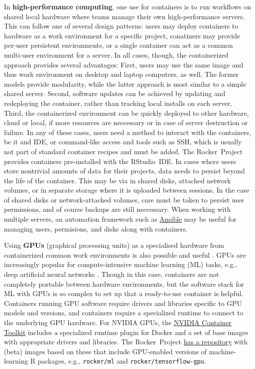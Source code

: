 In \textbf{high-performance computing}, one use for containers is to run
workflows on shared local hardware where teams manage their own
high-performance servers. This can follow one of several design
patterns: users may deploy containers to hardware as a work environment
for a specific project, conatiners may provide per-user persistent
environments, or a single container can act as a common multi-user
environment for a server. In all cases, though, the containerized
approach provides several advantages: First, users may use the same
image and thus work environment on desktop and laptop computers, as
well. The former models provide modularity, while the latter approach is
most similar to a simple shared server. Second, software updates can be
achieved by updating and redeploying the container, rather than tracking
local installs on each server. Third, the containerized environment can
be quickly deployed to other hardware, cloud or local, if more resources
are neccessary or in case of server destruction or failure. In any of
these cases, users need a method to interact with the containers, be it
and IDE, or command-like access and tools such as SSH, which is usually
not part of standard container recipes and must be added. The
Rocker~Project provides containers pre-installed with the RStudio~IDE.
In cases where users store nontrivial amounts of data for their
projects, data needs to persist beyond the life of the container. This
may be via in shared disks, attached network volumes, or in separate
storage where it is uploaded between sessions. In the case of shared
disks or network-attached volumes, care must be taken to persist user
permissions, and of course backups are still neccessary. When working
with multiple servers, an automation framework such as
\href{https://www.ansible.com}{Ansible} may be useful for managing
users, permisions, and disks along with containers.

\label{rocker-gpu} Using \textbf{GPUs} (graphical processing units) as a
specialised hardware from containerized common work environments is also
possible and useful \citep{haydel_enhancing_2015}. GPUs are increasingly
popular for compute-intensive machine learning (ML) tasks, e.g., deep
artificial neural networks \citep{schmidhuber_deep_2015}. Though in this
case, containers are not completely portable between hardware
environments, but the software stack for ML with GPUs is so complex to
set up that a ready-to-use container is helpful. Containers running GPU
software require drivers and libraries specific to GPU models and
versions, and containers require a specialized runtime to connect to the
underlying GPU hardware. For NVIDIA GPUs, the
\href{https://github.com/NVIDIA/nvidia-docker}{NVIDIA Container Toolkit}
includes a specialized runtime plugin for Docker and a set of base
images with appropriate drivers and libraries. The Rocker~Project
\href{https://github.com/rocker-org/ml}{has a repository} with (beta)
images based on these that include GPU-enabled versions of
machine-learning R packages, e.g., \texttt{rocker/ml} and
\texttt{rocker/tensorflow-gpu}.

